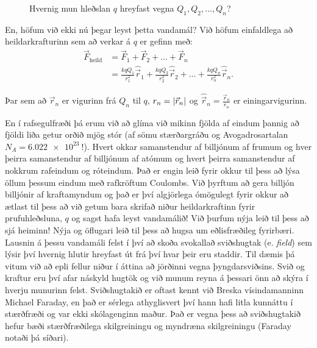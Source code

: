 \begin{figure}[H]
    \centering
    \caption{Hvernig mun hleðslan $q$ hreyfast vegna $Q_1, Q_2, \ldots, Q_n$?}
\end{figure}

En, höfum við ekki nú þegar leyst þetta vandamál? Við höfum einfaldlega að heildarkrafturinn sem að verkar á $q$ er gefinn með:
\begin{align*}
    \vec{F}_{\text{heild}} &= \vec{F}_1 + \vec{F}_2 + \ldots + \vec{F}_n \\
    &= \frac{kqQ_1}{r_1^2} \hat{\vec{r}}_1 + \frac{kqQ_2}{r_2^2} \hat{\vec{r}}_2 + \ldots + \frac{kqQ_n}{r_n^2} \hat{\vec{r}}_n.
\end{align*}

Þar sem að $\vec{r}_n$ er vigurinn frá $Q_n$ til $q$, $r_n = \abs{\vec{r}_n}$ og $\hat{\vec{r}}_n = \frac{\vec{r}_n}{r_n}$ er einingarvigurinn.

En í rafsegulfræði þá erum við að glíma við mikinn fjölda af eindum þannig að fjöldi liða getur orðið mjög stór (af sömu stærðargráðu og Avogadrosartalan $N_A = \SI{6.022e23}{}$!). Hvert okkar samanstendur af billjónum af frumum og hver þeirra samanstendur af billjónum af atómum og hvert þeirra samanstendur af nokkrum rafeindum og róteindum. Það er engin leið fyrir okkur til þess að lýsa öllum þessum eindum með rafkröftum Coulombs. Við þyrftum að gera billjón billjónir af kraftamyndum og það er því algjörlega ómögulegt fyrir okkur að ætlast til þess að við getum bara skrifað niður heildarkraftinn fyrir prufuhleðsluna, $q$ og sagst hafa leyst vandamálið! Við þurfum nýja leið til þess að sjá heiminn! Nýja og öflugari leið til þess að hugsa um eðlisfræðileg fyrirbæri. Lausnin á þessu vandamáli felst í því að skoða svokallað sviðshugtak (e. \emph{field}) sem lýsir því hvernig hlutir hreyfast út frá því hvar þeir eru staddir. Til dæmis þá vitum við að epli fellur niður í áttina að jörðinni vegna þyngdarsviðsins. Svið og kraftur eru því afar náskyld hugtök og við munum reyna á þessari önn að skýra í hverju munurinn felst. Sviðshugtakið er oftast kennt við Breska vísindamanninn Michael Faraday, en það er sérlega athyglisvert því hann hafi litla kunnáttu í stærðfræði og var ekki skólagenginn maður. Það er vegna þess að sviðshugtakið hefur bæði stærðfræðilega skilgreiningu og myndræna skilgreiningu (Faraday notaði þá síðari).

